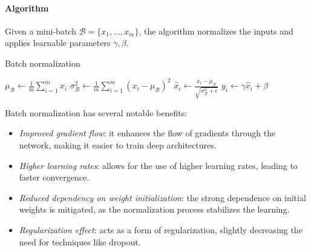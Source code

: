 \paragraph*{Algorithm}
Given a mini-batch $\mathcal{B} = \{ x_1, \dots, x_m \}$, the algorithm normalizes the inputs and applies learnable parameters $\gamma, \beta$. 
\begin{algorithm}
    \caption{Batch normalization}
    \begin{algorithmic}[1]
        \State $\mu_{\mathcal{B}} \gets \frac{1}{m} \sum_{i=1}^m x_i$ 
        \State $\sigma_{\mathcal{B}}^2 \gets \frac{1}{m} \sum_{i=1}^m (x_i - \mu_{\mathcal{B}})^2$ 
        \State $\hat{x}_i \gets \frac{x_i - \mu_{\mathcal{B}}}{\sqrt{\sigma_{\mathcal{B}}^2 + \epsilon}}$ 
        \State $y_i \gets \gamma \hat{x}_i + \beta$ 
    \end{algorithmic}
\end{algorithm}
\noindent Batch normalization has several notable benefits:
\begin{itemize}
    \item \textit{Improved gradient flow}: it enhances the flow of gradients through the network, making it easier to train deep architectures.
    \item \textit{Higher learning rates}: allows for the use of higher learning rates, leading to faster convergence.
    \item \textit{Reduced dependency on weight initialization}: the strong dependence on initial weights is mitigated, as the normalization process stabilizes the learning.
    \item \textit{Regularization effect}: acts as a form of regularization, slightly decreasing the need for techniques like dropout.
\end{itemize}

